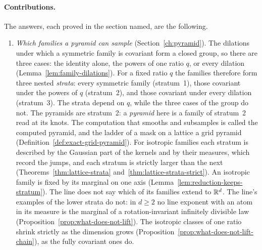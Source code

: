 \paragraph{Contributions.} The answers, each proved in the section named, are the following.
\begin{enumerate}
\item \emph{Which families a pyramid can sample} (Section~\ref{ch:pyramid}). The dilations under
which a symmetric family is covariant form a closed group, so there are three cases: the identity
alone, the powers of one ratio $q$, or every dilation (Lemma~\ref{lem:family-dilations}). For a
fixed ratio $q$ the families therefore form three nested \emph{strata}: every symmetric family
(stratum~1), those covariant under the powers of $q$ (stratum~2), and those covariant under every
dilation (stratum~3). The strata depend on $q$, while the three cases of the group do not. The
pyramids are stratum~2: a \emph{pyramid} here is a family of stratum~2 read at its knots. The
computation that smooths and subsamples is called the computed pyramid, and the ladder of a mask on
a lattice a grid pyramid (Definition~\ref{def:exact-grid-pyramid}). For isotropic families each stratum is described by the
Gaussian part of the kernels and by their \Levy{} measures, which record the jumps, and each stratum
is strictly larger than the next (Theorems~\ref{thm:lattice-strata}
and~\ref{thm:lattice-strata-strict}). An isotropic family is fixed by its marginal on one axis
(Lemma~\ref{lem:reduction-keeps-stratum}). The line does not say which of its families extend to
$\mathbb{R}^d$. The line's examples of the lower strata do not: in $d \ge 2$ no line exponent with
an atom in its \Levy{} measure is the marginal of a rotation-invariant infinitely divisible law
(Proposition~\ref{prop:what-does-not-lift}). The isotropic classes of one ratio shrink strictly as
the dimension grows (Proposition~\ref{prop:what-does-not-lift-chain}), as the fully covariant ones
do.


\end{enumerate}
